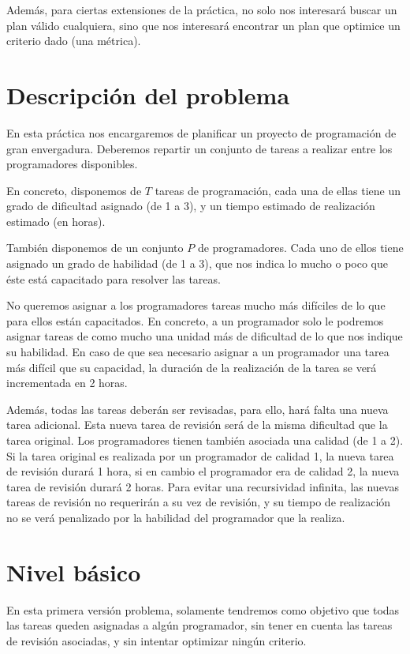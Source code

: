 \documentclass[11pt]{article}
\begin{document}
Además, para ciertas extensiones de la práctica, no solo nos interesará buscar un plan válido cualquiera, sino que nos interesará encontrar un plan que optimice un criterio dado (una métrica).

\section{Descripción del problema}
En esta práctica nos encargaremos de planificar un proyecto de programación de gran envergadura.
Deberemos repartir un conjunto de tareas a realizar entre los programadores disponibles.

En concreto, disponemos de $T$ tareas de programación, cada una de ellas tiene un grado de dificultad asignado (de 1 a 3), y un tiempo estimado de realización estimado (en horas).

También disponemos de un conjunto $P$ de programadores. Cada uno de ellos tiene asignado un grado de habilidad (de 1 a 3), que nos indica lo mucho o poco que éste está capacitado para resolver las tareas.

No queremos asignar a los programadores tareas mucho más difíciles de lo que para ellos están capacitados. En concreto, a un programador solo le podremos asignar tareas de como mucho una unidad más de dificultad de lo que nos indique su habilidad. En caso de que sea necesario asignar a un programador una tarea más difícil que su capacidad, la duración de la realización de la tarea se verá incrementada en 2 horas.

Además, todas las tareas deberán ser revisadas, para ello, hará falta una nueva tarea adicional. Esta nueva tarea de revisión será de la misma dificultad que la tarea original.
Los programadores tienen también asociada una calidad (de 1 a 2). Si la tarea original es realizada por un programador de calidad 1, la nueva tarea de revisión durará 1 hora, si en cambio el programador era de calidad 2, la nueva tarea de revisión durará 2 horas. 
Para evitar una recursividad infinita, las nuevas tareas de revisión no requerirán a su vez de revisión, y su tiempo de realización no se verá penalizado por la habilidad del programador que la realiza.


\section{Nivel básico} \label{basic}
En esta primera versión problema, solamente tendremos como objetivo que todas las tareas queden asignadas a algún programador, sin tener en cuenta las tareas de revisión asociadas, y sin intentar optimizar ningún criterio.
\end{document}
